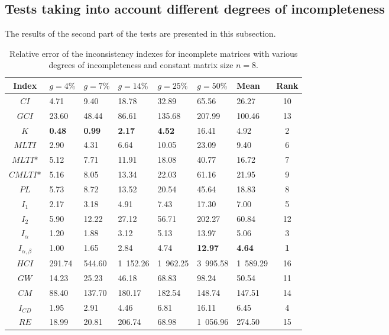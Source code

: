 \newpage
\subsection{Tests taking into account different degrees of incompleteness}
The results of the second part of the tests are presented in this subsection.
\begin{table}[ht]
\begin{center}
\caption{Relative error of the inconsistency indexes for incomplete matrices with various degrees of incompleteness and constant matrix size $n=8$.}
\label{tab:results2}
\begin{tabular}{|c||lllll||l|c|}
\hline Index & $g=4\%$ & $g=7\%$ & $g=14\%$ & $g=25\%$ & $g=50\%$ & Mean & Rank \\ \hline \hline
$\textit{CI}$ & 4.71 & 9.40 & 18.78 & 32.89 & 65.56 & 26.27 & 10 \\ \hline
$\textit{GCI}$ & 23.60 & 48.44 & 86.61 & 135.68 & 207.99 & 100.46  & 13 \\ \hline
$\textit{K}$ & \textbf{0.48} & \textbf{0.99} & \textbf{2.17} & \textbf{4.52} & 16.41 & 4.92 & 2 \\ \hline
$\textit{MLTI}$ & 2.90 & 4.31 & 6.64 & 10.05 & 23.09 & 9.40 & 6 \\ \hline
$\textit{MLTI*}$ & 5.12 & 7.71 & 11.91 & 18.08 & 40.77 & 16.72 & 7 \\ \hline
$\textit{CMLTI*}$ & 5.16 & 8.05 & 13.34 & 22.03 & 61.16 & 21.95 & 9 \\ \hline
$\textit{PL}$ & 5.73 & 8.72 & 13.52 & 20.54 & 45.64 & 18.83 & 8 \\ \hline
$I_1$ & 2.17 & 3.18 & 4.91 & 7.43 & 17.30 & 7.00 & 5 \\ \hline
$I_2$ & 5.90 & 12.22 & 27.12 & 56.71 & 202.27 & 60.84 & 12 \\ \hline
$I_{\alpha}$ & 1.20 & 1.88 & 3.12 & 5.13 & 13.97 & 5.06 & 3 \\ \hline
$I_{\alpha,\beta}$ & 1.00 & 1.65 & 2.84 & 4.74 & \textbf{12.97} & \textbf{4.64} & \textbf{1} \\ \hline
$\textit{HCI}$ & 291.74 & 544.60 & 1 152.26 & 1 962.25 & 3 995.58 & 1 589.29 & 16 \\ \hline
$\textit{GW}$ & 14.23 & 25.23 & 46.18 & 68.83 & 98.24 & 50.54 & 11 \\ \hline
$\textit{CM}$ & 88.40 & 137.70 & 180.17 & 182.54 & 148.74 & 147.51 & 14 \\ \hline
$I_{CD}$ & 1.95 & 2.91 & 4.46 & 6.81 & 16.11 & 6.45 & 4 \\ \hline
$\textit{RE}$ & 18.99 & 20.81 & 206.74 & 68.98 & 1 056.96 & 274.50 & 15 \\ \hline
\end{tabular}
\end{center}
\end{table}


